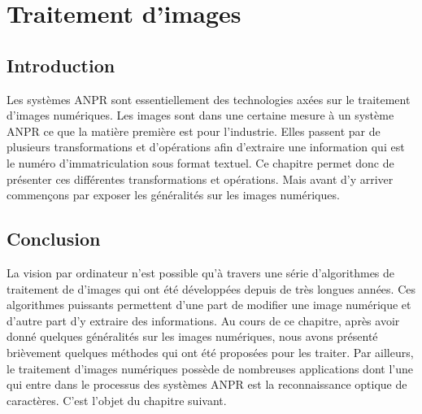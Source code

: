 \chapter{\textbf{Traitement d'images}}
    \section{Introduction}
    Les systèmes ANPR sont essentiellement des technologies axées sur le traitement d’images numériques. Les images sont dans une certaine mesure à un système ANPR ce que la matière première est pour l’industrie. Elles passent par de plusieurs transformations et d’opérations afin d'extraire une information qui est le numéro d’immatriculation sous format textuel. Ce chapitre permet donc de présenter ces différentes transformations et opérations. Mais avant d’y arriver commençons par exposer les généralités sur les images numériques.

    
    


    \section{Conclusion}
    La vision par ordinateur n’est possible qu’à travers une série d’algorithmes de traitement de d’images qui ont été développées depuis de très longues années. Ces algorithmes puissants permettent d’une part de modifier une image numérique  et d’autre part d'y  extraire des informations. Au cours de ce chapitre, après avoir donné quelques généralités sur les images numériques, nous avons présenté brièvement quelques méthodes qui ont été proposées pour les traiter. Par ailleurs, le traitement d’images numériques possède de nombreuses applications dont l’une qui entre dans le processus des systèmes ANPR est la reconnaissance optique de caractères. C’est l’objet du chapitre suivant. 
